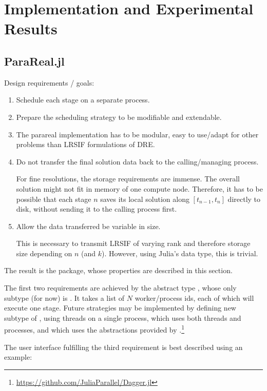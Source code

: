 \chapter{Implementation and Experimental Results}

\section{ParaReal.jl}

Design requirements / goals:
\begin{enumerate}
  \item
    Schedule each stage on a separate process.
  \item
    Prepare the scheduling strategy to be modifiable and extendable.
  \item
    The parareal implementation has to be modular,
    \ie easy to use/adapt for other problems than \ac{LRSIF} formulations of \ac{DRE}.
  \item
    Do not transfer the final solution data back to the calling/managing process.

    For fine resolutions, the storage requirements are immense.
    The overall solution might not fit in memory of one compute node.
    Therefore, it has to be possible that each stage $n$ saves its local solution along $[t_{n-1},t_n]$ directly to disk,
    without sending it to the calling process first.
  \item
    Allow the data transferred be variable in size.

    This is necessary to transmit \ac{LRSIF} of varying rank and therefore storage size depending on $n$ (and $k$).
    However, using Julia's  data type, this is trivial.
\end{enumerate}
The result is the  package,
whose properties are described in this section.

The first two requirements are achieved by the abstract type ,
whose only subtype (for now) is .
It takes a list of $N$ worker/process ids, each of which will execute one stage.
Future strategies may be implemented by defining new subtype of , \eg
{} using threads on a single process,
 which uses both threads and processes, and
 which uses the abstractions provided by .\footnote{\url{https://github.com/JuliaParallel/Dagger.jl}}

The user interface fulfilling the third requirement is best described using an example:


